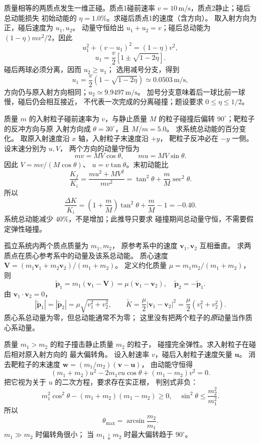 质量相等的两质点发生一维正碰。质点1碰前速率
$v=10\,\mathrm{m/s}$，质点2静止；碰后总动能损失
初始动能的 $\eta=1.0\%$。求碰后质点1的速度（含方向）。
\exsolution
取入射方向为正，碰后速度为 $u_1,u_2$。
动量守恒给出 $u_1+u_2=v$；碰后总动能为
$(1-\eta)mv^2/2$，因此
\[
u_1^2+(v-u_1)^2=(1-\eta)v^2,
\]
\[
u_1=\frac v2\left[1\pm\sqrt{1-2\eta}\right].
\]
碰后两球必须分离，因而 $u_2\ge u_1$；
选用减号分支，得到
\[
\boxed{u_1=\frac v2(1-\sqrt{1-2\eta})
\simeq0.0503\,\mathrm{m/s}},
\]
方向仍与原入射方向相同；$u_2\simeq9.9497\,\mathrm{m/s}$。
\excheck 加号分支意味着后一球比前一球慢，碰后仍会相互接近，
不代表一次完成的分离碰撞；题设要求 $0\le\eta\le1/2$。

质量 $m$ 的入射粒子碰前速率为 $v$，与静止质量
$M$ 的粒子碰撞后偏转 $90^\circ$；靶粒子的反冲方向与原
入射方向成 $\theta=30^\circ$，且 $M/m=5.0$。
求系统总动能的百分变化。
\exsolution
取原入射速度沿 $x$ 轴，入射粒子末速度沿 $+y$，
靶粒子反冲必在 $-y$ 一侧。设末速分别为 $u,V$，
两个方向的动量守恒为
\[
mv=MV\cos\theta,\qquad mu=MV\sin\theta.
\]
因此 $V=mv/(M\cos\theta)$、
$u=v\tan\theta$。末初动能比
\[
\frac{K_f}{K_i}
=\frac{mu^2+MV^2}{mv^2}
=\tan^2\theta+\frac mM\sec^2\theta.
\]
所以
\[
\boxed{\frac{\Delta K}{K_i}
=\left(1+\frac mM\right)\tan^2\theta+
\frac mM-1=-0.40}.
\]
\excheck 系统总动能减少 $40\%$，不是增加；此推导只要求
碰撞期间总动量守恒，不需要假定弹性碰撞。

孤立系统内两个质点质量为 $m_1,m_2$，
原参考系中的速度 $\bm v_1,\bm v_2$ 互相垂直。
求两质点在质心参考系中的动量及该系总动能。
\exsolution
质心速度
$\bm V=(m_1\bm v_1+m_2\bm v_2)/(m_1+m_2)$。
定义约化质量 $\mu=m_1m_2/(m_1+m_2)$，则
\[
\widetilde{\bm p}_1
=m_1(\bm v_1-\bm V)=\mu(\bm v_1-\bm v_2),
\quad
\widetilde{\bm p}_2=-\widetilde{\bm p}_1.
\]
由 $\bm v_1\cdot\bm v_2=0$，
\[
\boxed{|\widetilde{\bm p}_1|
=|\widetilde{\bm p}_2|=\mu\sqrt{v_1^2+v_2^2}},
\qquad
\boxed{\widetilde K
=\frac{\mu}{2}|\bm v_1-\bm v_2|^2
=\frac{\mu}{2}(v_1^2+v_2^2)}.
\]
\excheck 质心系总动量为零，但总动能通常不为零；
这里没有把两个粒子的\emph{原}动量当作质心系动量。

质量 $m_1>m_2$ 的粒子撞击静止质量 $m_2$ 的粒子，
碰撞完全弹性。求入射粒子在碰后相对原入射方向的
最大偏转角。
\exsolution
设入射速率 $v$，碰后入射粒子速度矢量 $\bm u$。
消去靶粒子的末速度
$\bm w=(m_1/m_2)(\bm v-\bm u)$，
由动能守恒得
\[
(m_1+m_2)u^2-2m_1vu\cos\theta+(m_1-m_2)v^2=0.
\]
把它视为关于 $u$ 的二次方程，要求存在实正根，
判别式非负：
\[
m_1^2\cos^2\theta-(m_1+m_2)(m_1-m_2)\ge0,
\quad \sin^2\theta\le\frac{m_2^2}{m_1^2}.
\]
所以
\[
\boxed{\theta_{\max}=\arcsin\frac{m_2}{m_1}}.
\]
\excheck $m_1\gg m_2$ 时偏转角很小；
当 $m_1\downarrow m_2$ 时最大偏转趋于 $90^\circ$。

